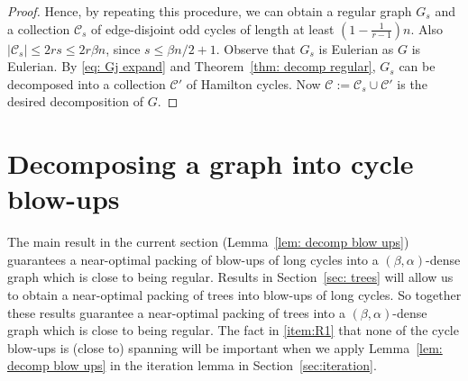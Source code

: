 \documentclass[a4paper, 11pt, reqno]{amsart}
\numberwithin{equation}{section}
\newcommand{\1}{{\rm 1\hspace*{-0.4ex}%
\rule{0.1ex}{1.52ex}\hspace*{0.2ex}}}
\newcommand{\cC}{\mathcal{C}}
\begin{document}
\begin{proof}
Hence, by repeating this procedure, we can obtain a regular graph $G_s$ 
and a collection $\cC_s$ of edge-disjoint odd cycles of length at least $(1-\frac{1}{r-1})n$. 
Also $|\cC_s|\leq 2rs \leq 2r\beta n$, since $s \leq \beta n/2 +1$. 
Observe that $G_s$ is Eulerian as $G$ is Eulerian.
By \eqref{eq: Gj expand} and Theorem~\ref{thm: decomp regular}, $G_s$ can be decomposed into a collection $\cC'$ of Hamilton cycles. 
Now $\cC := \cC_s\cup \cC'$ is the desired decomposition of $G$.
\end{proof}















\section{Decomposing a graph into cycle blow-ups}
\label{sec: decomp to cycle}
The main result in the current section (Lemma~\ref{lem: decomp blow ups}) guarantees a near-optimal packing of blow-ups of long cycles into a $(\beta,\alpha)$-dense graph which is close to being regular. Results in Section~\ref{sec: trees} will allow us to obtain a near-optimal packing of trees into blow-ups of long cycles. So together these results guarantee a near-optimal packing of trees into a $(\beta,\alpha)$-dense graph which is close to being regular. The fact in \ref{item:R1} that none of the cycle blow-ups is (close to) spanning will be important when we apply Lemma~\ref{lem: decomp blow ups} in the iteration lemma in Section~\ref{sec:iteration}.
\end{document}
